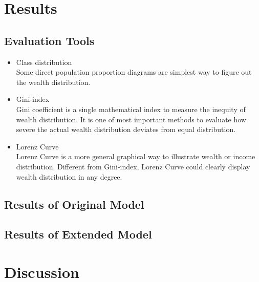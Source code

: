 \section{Results}
\subsection{Evaluation Tools}
\begin{itemize}
	\item Class distribution\\
	Some direct population proportion diagrams are simplest way to figure out the wealth distribution.
	\item Gini-index\\
	Gini coefficient is a single mathematical index to measure the inequity of wealth distribution. It is one of most important methods to evaluate how severe the actual wealth distribution deviates from equal distribution.
	\item Lorenz Curve\\
	Lorenz Curve is a more general graphical way to illustrate wealth or income distribution. Different from Gini-index, Lorenz Curve could clearly display wealth distribution in any degree.  
\end{itemize}
\subsection{Results of Original Model}
\subsection{Results of Extended Model}
\section{Discussion}




